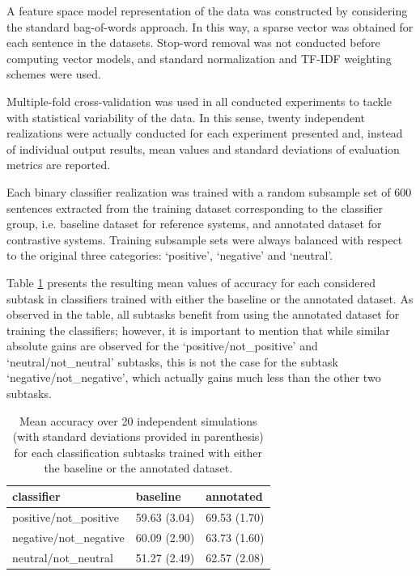 \documentclass[11pt, a4paper,onecolumn]{article}
\begin{document}
A feature space model representation of the data was constructed by considering the standard bag-of-words approach. 
In this way, a sparse vector was obtained for each sentence in the datasets. Stop-word removal was not
conducted before computing vector models, and standard normalization and TF-IDF weighting schemes were used.

Multiple-fold cross-validation was used in all conducted experiments to tackle with statistical variability of the 
data. In this sense, twenty independent realizations were actually conducted for each experiment presented and,
instead of individual output results, mean values and standard deviations of evaluation metrics are reported.

Each binary classifier realization was trained with a random subsample set of 600 sentences extracted from 
the training dataset corresponding to the classifier group, i.e. baseline dataset for reference systems, 
and annotated dataset for contrastive systems. Training subsample sets were always balanced with respect to 
the original three categories: `positive', `negative' and `neutral'.


Table \ref{tc_accu} presents the resulting mean values of accuracy for each considered subtask 
in classifiers trained with either the baseline or the annotated dataset. As observed in the table,
all subtasks benefit from using the annotated dataset for training the classifiers; however, it is 
important to mention that while similar absolute gains are observed for the `positive/not\_positive' 
and `neutral/not\_neutral' subtasks, this is not the case for the subtask `negative/not\_negative', 
which actually gains much less than the other two subtasks.

\begin{table}
\begin{center}
\begin{small}
\begin{tabular}{|l|l|l|}
\hline
classifier &baseline &annotated \\ 
\hline
positive/not\_positive &59.63 (3.04) &69.53 (1.70) \\ 
\hline
negative/not\_negative &60.09 (2.90) &63.73 (1.60) \\ 
\hline
neutral/not\_neutral &51.27 (2.49) &62.57 (2.08) \\ 
\hline
\end{tabular}
\end{small}
\caption{Mean accuracy over 20 independent simulations (with standard deviations provided in parenthesis) 
for each classification subtasks trained with either the baseline or the annotated dataset.}
\label{tc_accu}
\end{center}
\end{table}
\end{document}
